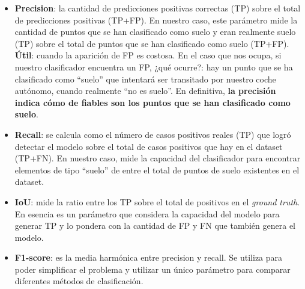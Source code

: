 \documentclass{article}
\begin{document}
\begin{tcolorbox}[colback=gray!5!white, colframe=gray!60!black, title=\textbf{Cómo se evalúa: matriz de confusión y métricas}]
\begin{itemize}
\item \textbf{Precision}: la cantidad de predicciones positivas correctas (TP) sobre el total de predicciones positivas (TP+FP). En nuestro caso, este parámetro mide la cantidad de puntos que se han clasificado como suelo y eran realmente suelo (TP) sobre el total de puntos que se han clasificado como suelo (TP+FP). \textbf{Útil}: cuando la aparición de FP es costosa. En el caso que nos ocupa, si nuestro clasificador encuentra un FP, ¿qué ocurre?: hay un punto que se ha clasificado como ``suelo'' que intentará ser transitado por nuestro coche autónomo, cuando realmente ``no es suelo''. En definitiva, \textbf{la precisión indica cómo de fiables son los puntos que se han clasificado como suelo}.
\item \textbf{Recall}: se calcula como el número de casos positivos reales (TP) que logró detectar el modelo sobre el total de casos positivos que hay en el dataset (TP+FN). En nuestro caso, mide la capacidad del clasificador para encontrar elementos de tipo ``suelo'' de entre el total de puntos de suelo existentes en el dataset.
\item \textbf{IoU}: mide la ratio entre los TP sobre el total de positivos en el \textit{ground truth}. En esencia es un parámetro que considera la capacidad del modelo para generar TP y lo pondera con la cantidad de FP y FN que también genera el modelo.
\item \textbf{F1-score}: es la media harmónica entre precision y recall. Se utiliza para poder simplificar el problema y utilizar un único parámetro para comparar diferentes métodos de clasificación.
\end{itemize}
\end{tcolorbox}
\end{document}
